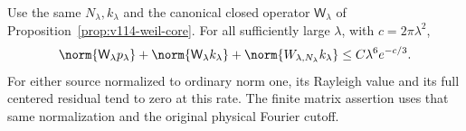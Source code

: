 \begin{proposition}
\label{prop:v115-absolute-residual}
Use the same $N_\lambda,k_\lambda$ and the canonical closed operator
$\mathsf W_\lambda$ of Proposition~\ref{prop:v114-weil-core}.
For all sufficiently large $\lambda$, with $c=2\pi\lambda^2$,
\begin{equation}\label{eq:v115-absolute-residual}
 \norm{\mathsf W_\lambda p_\lambda}
 +\norm{\mathsf W_\lambda k_\lambda}
 +\norm{W_{\lambda,N_\lambda}k_\lambda}
       \le C\lambda^6 e^{-c/3}.
\end{equation}
For either source normalized to ordinary norm one, its Rayleigh value
and its full centered residual tend to zero at this rate. The finite
matrix assertion uses that same normalization and the original physical
Fourier cutoff.
\end{proposition}
